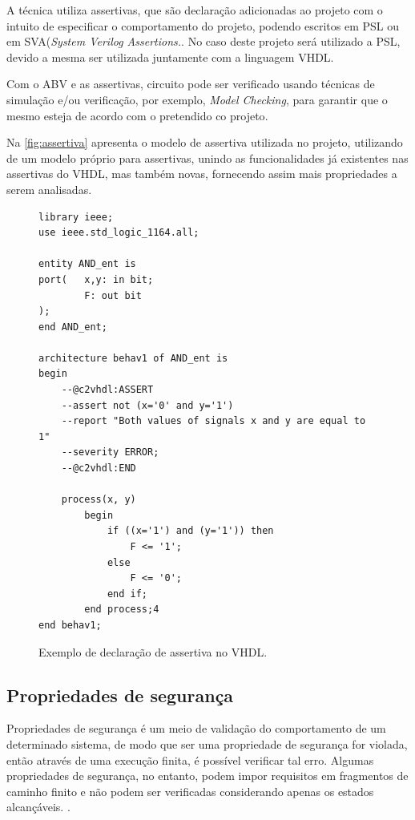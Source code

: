 \par
A técnica utiliza assertivas, que são declaração adicionadas ao projeto com o intuito de especificar o comportamento do projeto, podendo escritos em PSL ou em SVA(\textit{System Verilog Assertions.}\cite{boule2005incorporating}. No caso deste projeto será utilizado a PSL, devido a mesma ser utilizada juntamente com a linguagem VHDL.

\par
Com o ABV e as assertivas, circuito pode ser verificado usando técnicas de simulação e/ou verificação, por exemplo, \textit{Model Checking}, para garantir que o mesmo esteja de acordo com o pretendido co projeto\cite{DahanCombining}. 

Na \autoref{fig:assertiva} apresenta o modelo de assertiva utilizada no projeto, utilizando de um modelo próprio para assertivas, unindo as funcionalidades já existentes nas assertivas do VHDL, mas também novas, fornecendo assim mais propriedades a serem analisadas.

\begin{figure}[thp]
\caption{\label{fig:assertiva} Exemplo de declaração de assertiva no VHDL.}
	\begin{center}
    \begin{minipage}{0.9\textwidth}
    \begin{lstlisting}       
library ieee;
use ieee.std_logic_1164.all;

entity AND_ent is
port(   x,y: in bit;
        F: out bit
);
end AND_ent;

architecture behav1 of AND_ent is
begin
	--@c2vhdl:ASSERT
    --assert not (x='0' and y='1')
    --report "Both values of signals x and y are equal to 1"
    --severity ERROR;
    --@c2vhdl:END

	process(x, y)
    	begin
        	if ((x='1') and (y='1')) then
            	F <= '1';
        	else
            	F <= '0';
        	end if;
    	end process;4
end behav1;

\end{lstlisting}
    \end{minipage}
	\end{center}
\end{figure}
\subsection{Propriedades de segurança}
Propriedades de segurança é um meio de validação do comportamento de um determinado sistema, de modo que ser uma propriedade de segurança for violada, então através de uma execução finita, é possível verificar tal erro. Algumas propriedades de segurança, no entanto, podem impor requisitos em fragmentos de caminho finito e não podem ser verificadas considerando apenas os estados alcançáveis. \cite{baier2008principles}.

